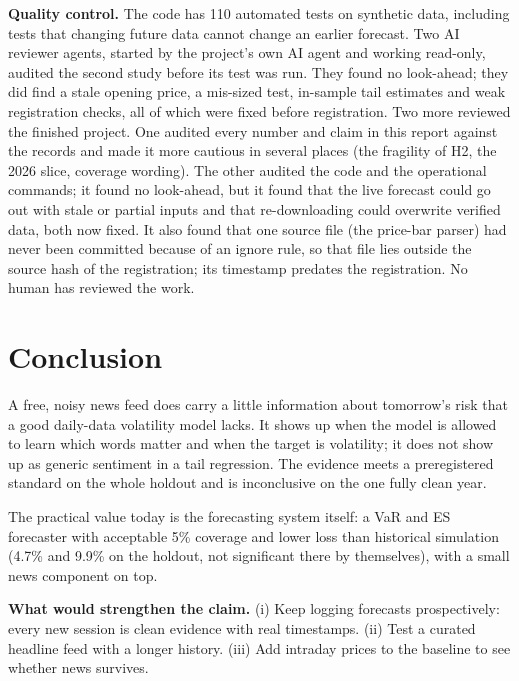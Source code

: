 \documentclass[11pt,a4paper]{article}
\begin{document}
\textbf{Quality control.} The code has 110 automated tests on synthetic data, including tests
that changing future data cannot change an earlier forecast. Two AI reviewer agents, started by
the project's own AI agent and working read-only, audited the second study before its test was
run. They found no look-ahead; they did find a stale opening price, a mis-sized test, in-sample
tail estimates and weak registration checks, all of which were fixed before registration.
Two more reviewed the finished project. One audited every number and claim in this report
against the records and made it more cautious in several places (the fragility of H2, the
2026 slice, coverage wording). The other audited the code and the operational commands; it
found no look-ahead, but it found that the live forecast could go out with stale or partial
inputs and that re-downloading could overwrite verified data, both now fixed. It also found
that one source file (the price-bar parser) had never been committed because of an ignore
rule, so that file lies outside the source hash of the registration; its timestamp predates
the registration. No human has reviewed the work.

\section{Conclusion}

A free, noisy news feed does carry a little information about tomorrow's risk that a good
daily-data volatility model lacks. It shows up when the model is allowed to learn which words
matter and when the target is volatility; it does not show up as generic sentiment in a tail
regression. The evidence meets a preregistered standard on the whole holdout and is
inconclusive on the one fully clean year.

The practical value today is the forecasting system itself: a VaR and ES forecaster with
acceptable 5\% coverage and lower loss than historical simulation (4.7\% and 9.9\% on the
holdout, not significant there by themselves), with a small news component on top.

\textbf{What would strengthen the claim.} (i) Keep logging forecasts prospectively: every new
session is clean evidence with real timestamps. (ii) Test a curated headline feed with a longer
history. (iii) Add intraday prices to the baseline to see whether news survives.
\end{document}
